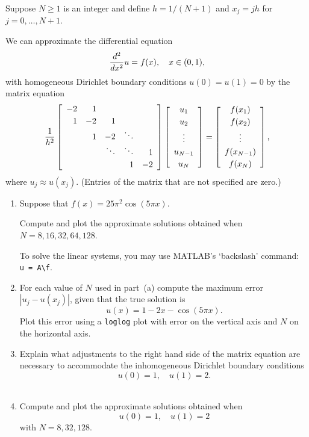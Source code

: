 Suppose $N\ge 1$ is an integer and define $h = 1/(N+1)$ and $x_j = jh$ for $j=0,\ldots, N+1$.

We can approximate the differential equation
\[ {d^2 \over dx^2} u = f(x), \quad x\in (0,1),\]
with homogeneous Dirichlet boundary conditions $u(0)=u(1) = 0$ by the matrix equation
\[ {1\over h^2} \left[\begin{array}{rrrrr}
              -2 & 1 \\[0.25em]
               1 & -2 & 1 \\
                 &  1  & -2 & \ddots \\
                 & & \ddots & \ddots & 1 \\[0.25em]
                 & & & 1 & -2 
               \end{array}\right]
          \left[\begin{array}{c} u_1 \\[0.25em] u_2 \\[0.25em] \vdots \\[0.25em] u_{N-1} \\[0.25em] u_N \end{array}\right]
 =   \left[\begin{array}{c} f(x_1) \\[0.25em] f(x_2) \\[0.25em] \vdots \\[0.25em] f(x_{N-1}) \\[0.25em] f(x_N) \end{array}\right],\]
where $u_j \approx u(x_j)$.  (Entries of the matrix that are not specified are zero.)

\begin{enumerate}
\item Suppose that $f(x) = 25 \pi^2 \cos (5\pi x)$.

Compute and plot the approximate solutions obtained when $N=8, 16, 32, 64, 128$.

To solve the linear systems, you may use MATLAB's `backslash' command: \verb| u = A\f|.
\\
\item For each value of $N$ used in part~(a) compute the maximum error $|u_j - u(x_j)|$, given that the true solution is
\[u(x) = 1-2x-\cos(5\pi x).\]
Plot this error using a \verb|loglog| plot with error on the vertical axis and $N$ on the horizontal axis.
\\
\item Explain what adjustments to the right hand side of the matrix equation are necessary to accommodate the inhomogeneous Dirichlet boundary conditions
\[ u(0)=1,\quad  u(1)=2.\]
\\
\item Compute and plot the approximate solutions obtained when
\[ u(0)=1,\quad  u(1)=2\]
with $N=8, 32, 128$.
\end{enumerate} 


